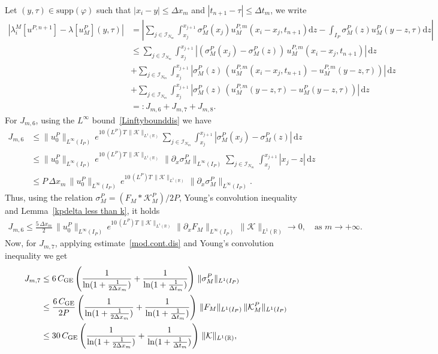 \documentclass[11pt]{amsart}
\newcommand{\K}{\mathcal{K}}
\newcommand{\dd}{\mathrm{d}}
\newcommand{\pa}{\partial}
\newcommand{\R}{\mathbb{R}}
\begin{document}
Let $(y,\tau) \in \mathrm{supp}(\varphi)$ such that $|x_i-y|\leq \Delta x_m$ and $|t_{n+1}-\tau|\leq\Delta t_m$, we write
\begin{align*}
    \left|\lambda_i^M[u^{P,n+1}]-\lambda[u^P_M](y,\tau)\right|
    &= \left|\sum_{j\in\mathcal{I}_{N_m}} \int_{x_j}^{x_{j+1}} \sigma_M^P(x_j) u^{P,m}_M(x_i-x_j,t_{n+1}) \dd z - \int_{I_P} \sigma_M^P(z)  u^P_M(y-z,\tau)  \dd z\right|\\
    &\leq \sum_{j\in\mathcal{I}_{N_m}} \int_{x_j}^{x_{j+1}} \left|\left(\sigma_M^P(x_j)-\sigma_M^P(z)\right)\, u^{P,m}_M(x_i-x_j,t_{n+1}) \right| \, \dd z\\
    &+\sum_{j\in\mathcal{I}_{N_m}} \int_{x_j}^{x_{j+1}} \left|\sigma_M^P(z) \, \left(u^{P,m}_M(x_i-x_j,t_{n+1})-u^{P,m}_M(y-z,\tau)\right)\right|\,\dd z\\
    &+\sum_{j\in\mathcal{I}_{N_m}} \int_{x_j}^{x_{j+1}} \left|\sigma_M^P(z) \, \left(u^{P,m}_M(y-z,\tau)-u^P_M(y-z,\tau)\right)\right|\,\dd z\\
    &=: J_{m,6}+J_{m,7}+J_{m,8}.
\end{align*}
For $J_{m,6}$, using the $L^\infty$ bound~\eqref{Linftybounddis} we have 
\begin{align*}
    J_{m,6} &\leq \|u^P_0\|_{L^\infty(I_P)} \, e^{10 \, (L^P)T \, \|\K\|_{L^1(\R)}} \sum_{j\in\mathcal{I}_{N_m}} \int_{x_j}^{x_{j+1}} \left|\sigma_M^P(x_j)-\sigma_M^P(z)\right|\, \dd z \\
    &\leq \|u^P_0\|_{L^\infty(I_P)} \, e^{10 \, (L^P)T \, \|\K\|_{L^1(\R)}} \, \|\pa_x \sigma_M^P\|_{L^\infty(I_P)} \sum_{j\in\mathcal{I}_{N_m}}\, \int_{x_j}^{x_{j+1}} \left|x_j-z\right|\, \dd z\\
    &\leq P \, \Delta x_m \,\|u^P_0\|_{L^\infty(I_P)} \, e^{10 \, (L^P)T \, \|\K\|_{L^1(\R)}} \, \|\pa_x \sigma_M^P\|_{L^\infty(I_P)}. 
\end{align*}
Thus, using the relation $\sigma_M^P= (F_M \ast \K^P_M)/2P$, Young's convolution inequality and Lemma~\ref{kpdelta less than k}, it holds
\begin{align}\label{J6}
    J_{m,6} \leq  \frac{5 \,\Delta x_m}{2} \, \|u^P_0\|_{L^\infty(I_P)} \, e^{10 \, (L^P)T \, \|\K\|_{L^1(\R)}} \, \|\pa_x F_M\|_{L^\infty(I_P)} \, \|\K\|_{L^1(\R)} \to 0, \quad \mbox{as }m\to +\infty.
\end{align}
Now, for $J_{m,7}$, applying estimate~\eqref{mod.cont.dis} and Young's convolution inequality
we get 
\begin{align*}
    J_{m,7} &\leq 6 \, {C}_{\rm GE} \left(\frac{1}{\ln(1+\frac{1}{2\Delta x_m})}+\frac{1}{\ln(1+\frac{1}{\Delta t_m})}\right) \, \|\sigma_M^P\|_{L^1(I_P)}\\
    &\leq \frac{6 \, {C}_{\rm GE}}{2P} \left(\frac{1}{\ln(1+\frac{1}{2\Delta x_m})}+\frac{1}{\ln(1+\frac{1}{\Delta t_m})}\right) \, \|F_M\|_{L^1(I_P)} \, \|\K^P_M\|_{L^1(I_P)}\\
    &\leq {30 \, {C}_{\rm GE} } \left(\frac{1}{\ln(1+\frac{1}{2\Delta x_m})}+\frac{1}{\ln(1+\frac{1}{\Delta t_m})}\right) \, \|\K\|_{L^1(\R)}, 
\end{align*}
\end{document}
